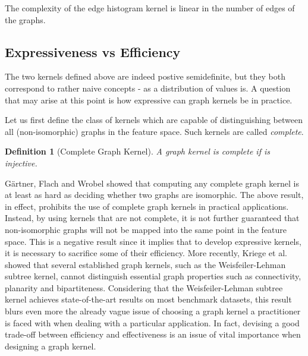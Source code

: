 \documentclass[twoside,11pt]{article}
\newtheorem{definition}{Definition}
\begin{document}
The complexity of the edge histogram kernel is linear in the number of edges of the graphs.

\subsection{Expressiveness vs Efficiency}
The two kernels defined above are indeed postive semidefinite, but they both correspond to rather naive concepts - as a distribution of values is.
A question that may arise at this point is how expressive can graph kernels be in practice.


Let us first define the class of kernels which are capable of distinguishing between all (non-isomorphic) graphs in the feature space.
Such kernels are called \textit{complete}.
\begin{definition}[Complete Graph Kernel]
  A graph kernel  is complete if  is injective.
\end{definition}
G{\"a}rtner, Flach and Wrobel \citeyear{gartner2003graph} showed that computing any complete graph kernel is at least as hard as deciding whether two graphs are isomorphic.
The above result, in effect, prohibits the use of complete graph kernels in practical applications.
Instead, by using kernels that are not complete, it is not further guaranteed that non-isomorphic graphs will not be mapped into the same point in the feature space.
This is a negative result since it implies that to develop expressive kernels, it is necessary to sacrifice some of their efficiency.
More recently, Kriege et al. \citeyear{kriege2018property} showed that several established graph kernels, such as the Weisfeiler-Lehman subtree kernel, cannot distinguish essential graph properties such as connectivity, planarity and bipartiteness.
Considering that the Weisfeiler-Lehman subtree kernel achieves state-of-the-art results on most benchmark datasets, this result blurs even more the already vague issue of choosing a graph kernel a practitioner is faced with when dealing with a particular application.
In fact, devising a good trade-off between efficiency and effectiveness is an issue of vital importance when designing a graph kernel.
\end{document}
